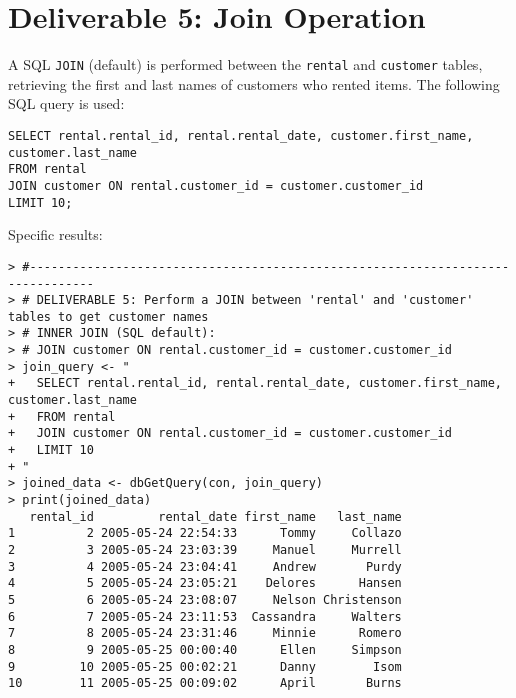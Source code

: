 \documentclass[a4paper,11pt]{extarticle}
\begin{document}
\section*{Deliverable 5: Join Operation}
A SQL \texttt{JOIN} (default) is performed between the \texttt{rental} and \texttt{customer} tables, retrieving the first and last names of customers who rented items. The following SQL query is used:
\begin{verbatim}
SELECT rental.rental_id, rental.rental_date, customer.first_name, customer.last_name
FROM rental
JOIN customer ON rental.customer_id = customer.customer_id
LIMIT 10;
\end{verbatim}
Specific results:
\begin{verbatim}
> #-------------------------------------------------------------------------------
> # DELIVERABLE 5: Perform a JOIN between 'rental' and 'customer' tables to get customer names
> # INNER JOIN (SQL default):
> # JOIN customer ON rental.customer_id = customer.customer_id 
> join_query <- "
+   SELECT rental.rental_id, rental.rental_date, customer.first_name, customer.last_name
+   FROM rental
+   JOIN customer ON rental.customer_id = customer.customer_id
+   LIMIT 10
+ "
> joined_data <- dbGetQuery(con, join_query)
> print(joined_data)
   rental_id         rental_date first_name   last_name
1          2 2005-05-24 22:54:33      Tommy     Collazo
2          3 2005-05-24 23:03:39     Manuel     Murrell
3          4 2005-05-24 23:04:41     Andrew       Purdy
4          5 2005-05-24 23:05:21    Delores      Hansen
5          6 2005-05-24 23:08:07     Nelson Christenson
6          7 2005-05-24 23:11:53  Cassandra     Walters
7          8 2005-05-24 23:31:46     Minnie      Romero
8          9 2005-05-25 00:00:40      Ellen     Simpson
9         10 2005-05-25 00:02:21      Danny        Isom
10        11 2005-05-25 00:09:02      April       Burns
\end{verbatim}

\newpage
\end{document}

